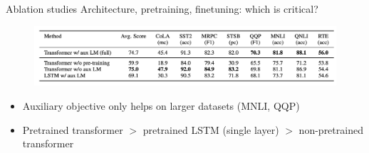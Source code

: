 \documentclass[usenames,dvipsnames,notes,11pt,aspectratio=169,hyperref={colorlinks=true, linkcolor=blue}]{beamer}
\begin{document}
\begin{frame}
    {Ablation studies}
    Architecture, pretraining, finetuning: which is critical?
    \begin{figure}
        \includegraphics[width=\textwidth]{figures/gpt-ablation}
    \end{figure}
    \begin{itemize}
        \item Auxiliary objective only helps on larger datasets (MNLI, QQP)
        \item Pretrained transformer $>$ pretrained LSTM (single layer) $>$ non-pretrained transformer
    \end{itemize}
\end{frame}
\end{document}
